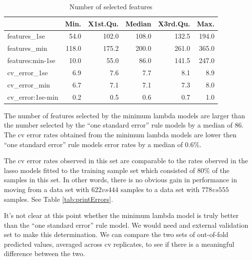 \documentclass[
]{book}
\begin{document}
\begin{table}

\caption{\label{tab:model-size-lassoAll}Number of selected features}
\centering
\begin{tabular}[t]{l|r|r|r|r|r}
\hline
  & Min. & X1st.Qu. & Median & X3rd.Qu. & Max.\\
\hline
features\_1se & 54.0 & 102.0 & 108.0 & 132.5 & 194.0\\
\hline
features\_min & 118.0 & 175.2 & 200.0 & 261.0 & 365.0\\
\hline
features:min-1se & 10.0 & 55.0 & 86.0 & 141.5 & 247.0\\
\hline
cv\_error\_1se & 6.9 & 7.6 & 7.7 & 8.1 & 8.9\\
\hline
cv\_error\_min & 6.7 & 7.1 & 7.1 & 7.3 & 8.0\\
\hline
cv\_error:1se-min & 0.2 & 0.5 & 0.6 & 0.7 & 1.0\\
\hline
\end{tabular}
\end{table}

The number of features selected by the minimum lambda models are larger
than the number selected by the ``one standard error'' rule models by a median
of \(86\).
The cv error rates obtained from the minimum lambda models are lower
then ``one standard error'' rule models error rates by a median of
\(0.6\)\%.

The cv error rates observed in this set are comparable to the
rates oberved in the lasso models fitted to the training sample set
which consisted of 80\% of the samples in this set. In other words,
there is no obvious gain in performance in moving from
a data set with
\(622 vs 444\) samples
to a data set with
\(778 vs 555\) samples.
See Table \ref{tab:printErrors}.

It's not clear at this point whether the minimum lambda model is truly better than
the ``one standard error'' rule model. We would need and external validation
set to make this determination. We can compare the two sets
of out-of-fold predicted values, averaged across cv replicates, to see if
there is a meaningful difference between the two.
\end{document}
